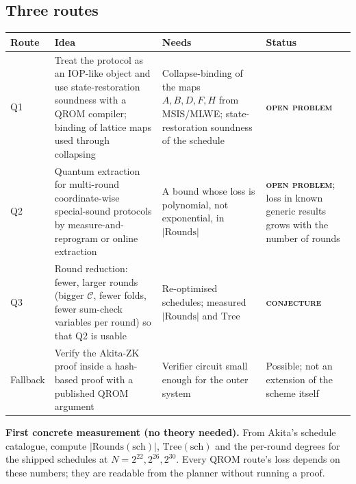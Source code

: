 \documentclass[11pt]{article}
\newcommand{\epitag}[3]{\colorbox{#2}{\textcolor{#1}{\textsc{\footnotesize\bfseries #3}}}}
\newcommand{\conjectureTag}{\epitag{conjyellow}{conjbg}{conjecture}}
\newcommand{\openproblem}{\epitag{openred}{openbg}{open problem}}
\renewcommand{\_}{\textunderscore\allowbreak{}}
\theoremstyle{definition}
\begin{document}
\subsection{Three routes}
\begin{center}
\small\renewcommand{\arraystretch}{1.2}
\begin{tabular}{@{}p{}p{}p{}p{}@{}}
\toprule
\textbf{Route} & \textbf{Idea} & \textbf{Needs} & \textbf{Status}\\
\midrule
Q1 & Treat the protocol as an IOP-like object and use state-restoration soundness with a QROM compiler; binding of lattice maps used through collapsing & Collapse-binding of the maps $A,B,D,F,H$ from MSIS/MLWE; state-restoration soundness of the schedule & \openproblem\\
Q2 & Quantum extraction for multi-round coordinate-wise special-sound protocols by measure-and-reprogram or online extraction & A bound whose loss is polynomial, not exponential, in $|\mathrm{Rounds}|$ & \openproblem; loss in known generic results grows with the number of rounds\\
Q3 & Round reduction: fewer, larger rounds (bigger $\mathcal{C}$, fewer folds, fewer sum-check variables per round) so that Q2 is usable & Re-optimised schedules; measured $|\mathrm{Rounds}|$ and $\mathrm{Tree}$ & \conjectureTag\\
Fallback & Verify the Akita-ZK proof inside a hash-based proof with a published QROM argument & Verifier circuit small enough for the outer system & Possible; not an extension of the scheme itself\\
\bottomrule
\end{tabular}
\end{center}
\textbf{First concrete measurement (no theory needed).} From Akita's schedule catalogue, compute $|\mathrm{Rounds}(\mathrm{sch})|$, $\mathrm{Tree}(\mathrm{sch})$ and the per-round degrees for the shipped schedules at $N=2^{22},2^{26},2^{30}$. Every QROM route's loss depends on these numbers; they are readable from the planner without running a proof.
\end{document}
